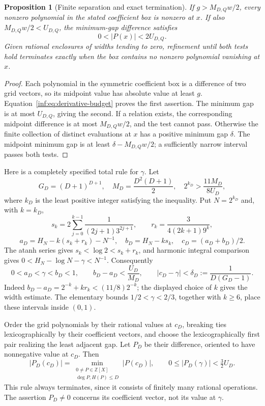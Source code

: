 \documentclass[11pt,a4paper]{article}
\newcommand{\Z}{\mathbb Z}
\newtheorem{proposition}[theorem]{Proposition}
\theoremstyle{definition}
\theoremstyle{remark}
\numberwithin{equation}{section}
\begin{document}
\begin{proposition}[Finite separation and exact termination]\label{inf:prop:finite-test}
If $g>M_{D,Q}w/2$, every nonzero polynomial in the stated coefficient box is nonzero at $x$. If also $M_{D,Q}w/2<U_{D,Q}$, the minimum-gap difference satisfies
\[
 0<|P(x)|<2U_{D,Q}.
\]
Given rational enclosures of widths tending to zero, refinement until both tests hold terminates exactly when the box contains no nonzero polynomial vanishing at $x$.
\end{proposition}
\begin{proof}
Each polynomial in the symmetric coefficient box is a difference of two grid vectors, so its midpoint value has absolute value at least $g$. Equation~\eqref{inf:eq:derivative-budget} proves the first assertion. The minimum gap is at most $U_{D,Q}$, giving the second. If a relation exists, the corresponding midpoint difference is at most $M_{D,Q}w/2$, and the test cannot pass. Otherwise the finite collection of distinct evaluations at $x$ has a positive minimum gap $\delta$. The midpoint minimum gap is at least $\delta-M_{D,Q}w/2$; a sufficiently narrow interval passes both tests.
\end{proof}

Here is a completely specified total rule for $\gamma$. Let
\[
 G_D=(D+1)^{D+1},\quad M_D=\frac{D^2(D+1)}2,
 \quad 2^{k_D}>\frac{11M_D}{8U_D},
\]
where $k_D$ is the least positive integer satisfying the inequality. Put $N=2^{k_D}$ and, with $k=k_D$,
\[
 s_k=2\sum_{j=0}^{k-1}\frac1{(2j+1)3^{2j+1}},
 \qquad r_k=\frac3{4(2k+1)9^k},
\]
\begin{equation}\label{inf:eq:midpoint}
 a_D=H_N-k(s_k+r_k)-N^{-1},\quad
 b_D=H_N-ks_k,\quad c_D=(a_D+b_D)/2.
\end{equation}
The atanh series gives $s_k<\log2<s_k+r_k$, and harmonic integral comparison gives $0<H_N-\log N-\gamma<N^{-1}$. Consequently
\begin{equation}\label{inf:eq:midpoint-error}
 0<a_D<\gamma<b_D<1,\qquad
 b_D-a_D<\frac{U_D}{M_D},\qquad
 |c_D-\gamma|<\delta_D:=\frac1{D(G_D-1)}.
\end{equation}
Indeed $b_D-a_D=2^{-k}+kr_k<(11/8)2^{-k}$; the displayed choice of $k$ gives the width estimate. The elementary bounds $1/2<\gamma<2/3$, together with $k\ge6$, place these intervals inside $(0,1)$.

Order the grid polynomials by their rational values at $c_D$, breaking ties lexicographically by their coefficient vectors, and choose the lexicographically first pair realizing the least adjacent gap. Let $P_D$ be their difference, oriented to have nonnegative value at $c_D$. Then
\begin{equation}\label{inf:eq:minimum}
 |P_D(c_D)|=\min_{\substack{0\ne P\in\Z[X]\\\deg P,H(P)\le D}}|P(c_D)|,
 \qquad 0\le|P_D(\gamma)|<\tfrac32U_D.
\end{equation}
This rule always terminates, since it consists of finitely many rational operations. The assertion $P_D\ne0$ concerns its coefficient vector, not its value at $\gamma$.
\end{document}

